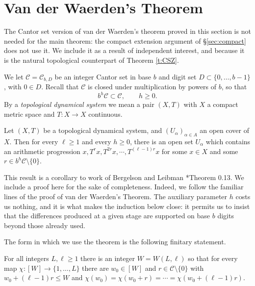 \section{Van der Waerden's Theorem} \label{sec:vdW}

The Cantor set version of van der Waerden's theorem proved in this section is not needed for the main theorem: 
the compact extension argument of \S\ref{sec:compact} does not use it.  We include it as a result of independent interest, 
and because it is the natural topological counterpart of Theorem \ref{t:CSZ}.  

We let $\mathcal C=\mathcal{C}_{b,D}$ be an integer Cantor set in base $b$ and digit set $D\subset \{0,\ldots ,b-1\}$, with $0\in D$.  
Recall that $\mathcal C$ is closed under multiplication by powers of $b$, so that 
\begin{equation} \label{e:bhC}
b ^{h} \mathcal C \subset \mathcal C , \qquad h \geq 0 . 
\end{equation}
By a \emph{topological dynamical system} we mean a pair $(X,T)$ with $X$ a compact metric space and $T \colon X \to X$ continuous. 

\begin{theorem}\label{thmCvdW} Let $(X,T)$ be a topological dynamical system, and $(U_\alpha)_{\alpha\in A}$ an open cover of $X$. Then for every $\ell \geq 1$ and every $h\geq 0$, there is an open set $U_\alpha$ which contains an arithmetic progression 
$x,T^rx,T^{2r}x,\cdots ,T^{(\ell-1)r}x$ for some $x\in X$ and some $r\in b ^{h}\mathcal C\setminus \{0\}$.
\end{theorem}

This result is a corollary to work of Bergelson and Leibman \cite{MR1325795}*{Theorem 0.13}. We include a proof here for the sake of completeness.   
Indeed, we follow the familiar lines of the proof of van der Waerden's Theorem.  
The auxiliary parameter $h$ costs us nothing, and it is what makes the induction below close: it permits us to insist that the 
differences produced at a given stage are supported on base $b$ digits beyond those already used.  

The form in which we use the theorem is the following finitary statement.  

\begin{corollary} \label{c:vdW}
For all integers $L, \ell \geq 1$ there is an integer $W= W(L,\ell )$ so that for every map 
$\chi \colon [W] \to \{1 , \ldots, L\}$ there are $w_0 \in [W]$ and $r \in \mathcal C \setminus \{0\}$ with 
$w_0 + ( \ell -1)r \leq W$ and $\chi (w_0) = \chi (w_0 + r) = \cdots = \chi (w_0 + (\ell -1) r)$. 
\end{corollary}

